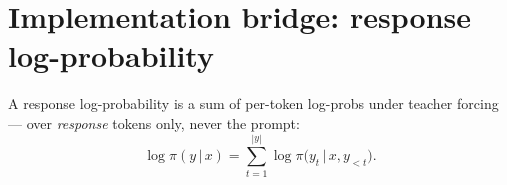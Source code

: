 \documentclass[11pt]{article}
\newcommand{\given}{\,\vert\,}
\begin{document}

\section{Implementation bridge: response log-probability}

A response log-probability is a sum of per-token log-probs under
teacher forcing --- over \emph{response} tokens only, never the prompt:
\begin{equation}
  \log \pi(y \given x)
  = \sum_{t=1}^{|y|} \log \pi\big( y_t \given x, y_{<t} \big).
  \label{eq:logprob}
\end{equation}

\end{document}
